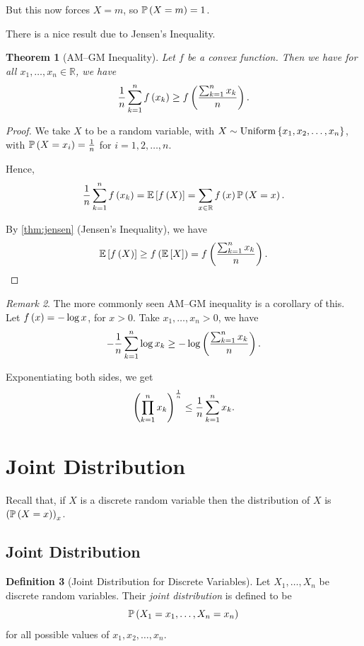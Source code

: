 \documentclass{article}
\newtheorem{theorem}{Theorem}[section]
\theoremstyle{definition}
\newtheorem{definition}[theorem]{Definition}
\theoremstyle{remark}
\newtheorem{remark}[theorem]{Remark}
\newcommand{\RR}{\mathbb{R}}
\newcommand{\Prob}{\mathbb{P}}
\newcommand{\Expt}{\mathbb{E}}
\newcommand{\Uniform}{\operatorname{Uniform}}
\begin{document}
But this now forces \(X = m\), so \(\Prob\pqty{X = m} = 1\).

There is a nice result due to Jensen's Inequality.

\begin{theorem}[AM--GM Inequality]
    \label{thm:am-gm}
    Let \(f\) be a convex function. Then we have for all \(x_1, \ldots, x_n \in \RR\), we have
    \[
        \frac{1}{n} \sum_{k = 1}^{n} f\left(x_k\right) \geq f\left(\frac{\sum_{k = 1}^{n} x_k}{n}\right).
    \]
\end{theorem}

\begin{proof}
    We take \(X\) to be a random variable, with \(X \sim \Uniform \Bqty{x_1, x_2, \ldots, x_n}\), with \(\Prob\pqty{X = x_i} = \frac{1}{n}\) for \(i = 1, 2, \ldots, n\).

    Hence,
    \[
        \frac{1}{n} \sum_{k = 1}^{n} f\pqty{x_k} = \Expt\bqty{f\pqty{X}} = \sum_{x \in \RR} f\pqty{x} \Prob\pqty{X = x}.
    \]

    By \autoref{thm:jensen} (Jensen's Inequality), we have
    \[
        \Expt\bqty{f\pqty{X}} \geq f\pqty{\Expt\bqty{X}} = f\pqty{\frac{\sum_{k = 1}^{n} x_k}{n}}.
    \]
\end{proof}

\begin{remark}
    The more commonly seen AM--GM inequality is a corollary of this. Let \(f\left(x\right) = - \log x\), for \(x > 0\). Take \(x_1, \ldots, x_n > 0\), we have
    \[
        - \frac{1}{n} \sum_{k = 1}^{n} \log x_k \geq - \log \left(\frac{\sum_{k = 1}^{n} x_k}{n}\right).
    \]

    Exponentiating both sides, we get
    \[
        \left(\prod_{k = 1}^{n} x_k\right)^{\frac{1}{n}} \leq \frac{1}{n} \sum_{k = 1}^{n} x_k.
    \]
\end{remark}

\section{Joint Distribution}

Recall that, if \(X\) is a discrete random variable then the distribution of \(X\) is \(\pqty{\Prob\pqty{X = x}}_x\).

\subsection{Joint Distribution}

\begin{definition}[Joint Distribution for Discrete Variables]
    \label{def:joint-distribution-discrete}%
    Let \(X_1, \ldots, X_n\) be discrete random variables. Their \emph{joint distribution} is defined to be
    \[
        \Prob\pqty{X_1 = x_1, \ldots, X_n = x_n}
    \]
    for all possible values of \(x_1, x_2, \ldots, x_n\).
\end{definition}
\end{document}
